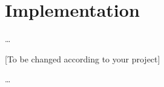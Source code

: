 \chapter{Implementation}
\label{chap:impl}

\ldots

[To be changed according to your project]

\ldots
